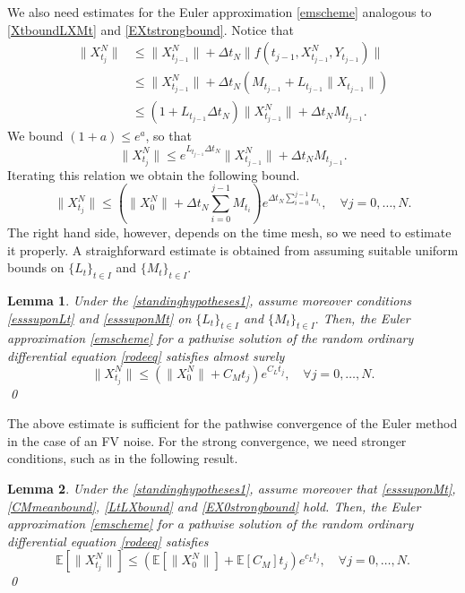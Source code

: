 \documentclass[reqno,12pt]{amsart}
\theoremstyle{plain} %
\newtheorem{lemma}{Lemma}[section]
\theoremstyle{definition} %
\begin{document}
We also need estimates for the Euler approximation \eqref{emscheme} analogous to \eqref{XtboundLXMt} and \eqref{EXtstrongbound}. Notice that
\begin{align*}
    \|X_{t_j}^N\| & \leq \|X_{t_{j-1}}^N\| + \Delta t_N \|f(t_{j-1}, X_{t_{j-1}}^N, Y_{t_{j-1}})\| \\
    & \leq \|X_{t_{j-1}}^N\| + \Delta t_N (M_{t_{j-1}} + L_{t_{j-1}}\|X_{t_{j-1}}\|) \\
    & \leq \left(1 + L_{t_{j-1}}\Delta t_N\right)\|X_{t_{j-1}}^N\| + \Delta t_N M_{t_{j-1}}.
\end{align*}
We bound $(1 + a) \leq e^a$, so that
\[
    \|X_{t_j}^N\| \leq e^{L_{t_{j-1}}\Delta t_N}\|X_{t_{j-1}}^N\| + \Delta t_N M_{t_{j-1}}.
\]
Iterating this relation we obtain the following bound.
\begin{equation}
    \label{XNtboundLXMtpre}
    \|X_{t_j}^N\| \leq \left(\|X_0^N\| + \Delta t_N \sum_{i=0}^{j-1} M_{t_i}\right)e^{\Delta t_N \sum_{i=0}^{j-1} L_{t_i}}, \quad \forall j = 0, \ldots, N.
\end{equation}
The right hand side, however, depends on the time mesh, so we need to estimate it properly. A straighforward estimate is obtained from assuming suitable uniform bounds on $\{L_t\}_{t\in I}$ and $\{M_t\}_{t\in I}.$
\begin{lemma}
    \label{lemXNtboundLXMt}
    Under the \cref{standinghypotheses1}, assume moreover conditions \eqref{esssuponLt} and \eqref{esssuponMt} on $\{L_t\}_{t\in I}$ and $\{M_t\}_{t\in I}.$ Then, the Euler approximation \eqref{emscheme} for a pathwise solution of the random ordinary differential equation \eqref{rodeeq} satisfies almost surely
    \begin{equation}
        \label{XNtboundLXMt}
        \|X_{t_j}^N\| \leq \left(\|X_0^N\| + C_M t_j \right)e^{C_L t_j}, \quad \forall j = 0, \ldots, N.
    \end{equation}
    \qed
\end{lemma}
The above estimate is sufficient for the pathwise convergence of the Euler method in the case of an FV noise. For the strong convergence, we need stronger conditions, such as in the following result.
\begin{lemma}
    \label{lemXNtmeanboundLXMt}
    Under the \cref{standinghypotheses1}, assume moreover that \eqref{esssuponMt}, \eqref{CMmeanbound}, \eqref{LtLXbound} and \eqref{EX0strongbound} hold. Then, the Euler approximation \eqref{emscheme} for a pathwise solution of the random ordinary differential equation \eqref{rodeeq} satisfies
    \begin{equation}
        \label{XNtmeanboundLXMt}
        \mathbb{E}\left[\|X_{t_j}^N\|\right] \leq \left(\mathbb{E}\left[\|X_0^N\|\right] + \mathbb{E}[C_M] t_j \right)e^{c_L t_j}, \quad \forall j = 0, \ldots, N.
    \end{equation}
    \qed
\end{lemma}
\end{document}
